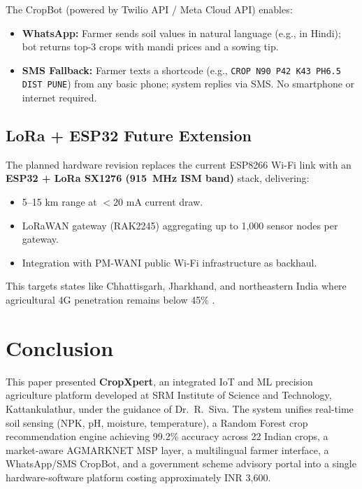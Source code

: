 \documentclass[10pt,twocolumn]{article}
\begin{document}
The CropBot (powered by Twilio API / Meta Cloud API) enables:
\begin{itemize}[leftmargin=1.2em, itemsep=1pt]
    \item \textbf{WhatsApp:} Farmer sends soil values in natural language (e.g., in Hindi); bot returns top-3 crops with mandi prices and a sowing tip.
    \item \textbf{SMS Fallback:} Farmer texts a shortcode (e.g., \texttt{CROP N90 P42 K43 PH6.5 DIST PUNE}) from any basic phone; system replies via SMS. No smartphone or internet required.
\end{itemize}

\subsection{LoRa + ESP32 Future Extension}

The planned hardware revision replaces the current ESP8266 Wi-Fi link with an \textbf{ESP32 + LoRa SX1276 (915~MHz ISM band)} stack, delivering:
\begin{itemize}[leftmargin=1.2em, itemsep=1pt]
    \item 5--15 km range at $<$20 mA current draw.
    \item LoRaWAN gateway (RAK2245) aggregating up to 1,000 sensor nodes per gateway.
    \item Integration with PM-WANI public Wi-Fi infrastructure as backhaul.
\end{itemize}
This targets states like Chhattisgarh, Jharkhand, and northeastern India where agricultural 4G penetration remains below 45\% \cite{trai2023}.

\section{Conclusion}

This paper presented \textbf{CropXpert}, an integrated IoT and ML precision agriculture platform developed at SRM Institute of Science and Technology, Kattankulathur, under the guidance of Dr.~R.~Siva. The system unifies real-time soil sensing (NPK, pH, moisture, temperature), a Random Forest crop recommendation engine achieving 99.2\% accuracy across 22 Indian crops, a market-aware AGMARKNET MSP layer, a multilingual farmer interface, a WhatsApp/SMS CropBot, and a government scheme advisory portal into a single hardware-software platform costing approximately INR 3,600.
\end{document}

